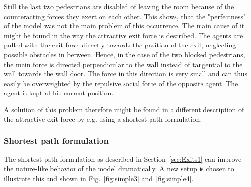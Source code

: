 \documentclass[11pt]{article}
\begin{document}
Still the last two pedestrians are disabled of leaving the room because of the counteracting forces they exert on each other. This shows, that the "perfectness" of the model was not the main problem of this occurrence. The main cause of it might be found in the way the attractive exit force is described. The agents are pulled with the exit force directly towards the position of the exit, neglecting possible obstacles in between. Hence, in the case of the two blocked pedestrians, the main force is directed perpendicular to the wall instead of tangential to the wall towards the wall door. The force in this direction is very small and can thus easily be overweighted by the repulsive social force of the opposite agent. The agent is kept at his current position.

A solution of this problem therefore might be found in a different description of the attractive exit force by e.g. using a shortest path formulation.

\subsubsection{Shortest path formulation}

The shortest path formulation as described in Section~\ref{sec:Exits1} can improve the nature-like behavior of the model dramatically. A new setup is chosen to illustrate this and shown in Fig.~\ref{fig:simple3} and~\ref{fig:simple4}.
\end{document}
